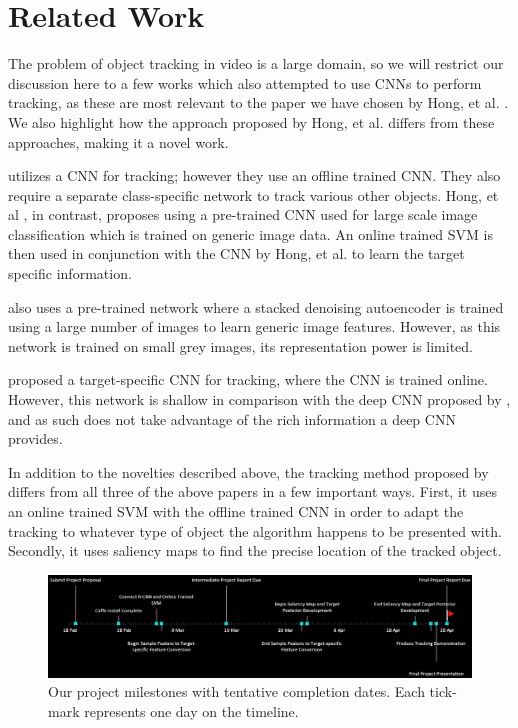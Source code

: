 \documentclass{sig-alternate-05-2015}
\begin{document}
\section{Related Work}
The problem of object tracking in video is a large domain, so we will restrict our discussion here to a few works which also attempted to use CNNs to perform tracking, as these are most relevant to the paper we have chosen by Hong, et al. \cite{hong2015online}.
We also highlight how the approach proposed by Hong, et al. differs from these approaches, making it a novel work.

\cite{fan2010human} utilizes a CNN for tracking; however they use an offline trained CNN. They also require a separate class-specific network to track various other objects. Hong, et al \cite{hong2015online}, in contrast, proposes using a pre-trained CNN used for large scale image classification which is trained on generic image data. An online trained SVM is then used in conjunction with the CNN by Hong, et al. to learn the target specific information.

\cite{NIPS2013_5192} also uses a pre-trained network where a stacked denoising autoencoder is trained using a large number of images to learn generic image features. However, as this network is trained on small grey images, its representation power is limited.

\cite{7362006} proposed a target-specific CNN for tracking, where the CNN is trained online. However, this network is shallow in comparison with the deep CNN proposed by \cite{hong2015online}, and as such does not take advantage of the rich information a deep CNN provides.

In addition to the novelties described above, the tracking method proposed by \cite{hong2015online} differs from all three of the above papers in a few important ways.
First, it uses an online trained SVM with the offline trained CNN in order to adapt the tracking to whatever type of object the algorithm happens to be presented with.
Secondly, it uses saliency maps to find the precise location of the tracked object.

\begin{figure}[t]
\centering
\includegraphics[width=\textwidth]{ProposedTimeline}
\caption{Our project milestones with tentative completion dates. Each tick-mark represents one day on the timeline.}
\label{fig:milestones}
\end{figure}
\end{document}
